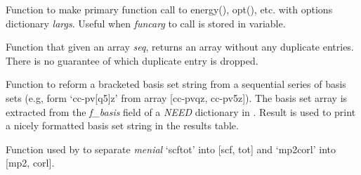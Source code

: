 \documentclass[letterpaper,10pt,english]{sphinxmanual}
\begin{document}
\begin{fulllineitems}
\label{index:wrappers.call_function_in_1st_argument}
Function to make primary function call to energy(), opt(), etc.
with options dictionary \emph{largs}.
Useful when \emph{funcarg} to call is stored in variable.

\end{fulllineitems}


\begin{fulllineitems}
\label{index:wrappers.drop_duplicates}
Function that given an array \emph{seq}, returns an array without any duplicate
entries. There is no guarantee of which duplicate entry is dropped.

\end{fulllineitems}


\begin{fulllineitems}
\label{index:wrappers.n_body}
\end{fulllineitems}


\begin{fulllineitems}
\label{index:wrappers.reconstitute_bracketed_basis}
Function to reform a bracketed basis set string from a sequential series
of basis sets (e.g, form `cc-pv{[}q5{]}z' from array {[}cc-pvqz, cc-pv5z{]}). The
basis set array is extracted from the \emph{f\_basis} field of a \emph{NEED} dictionary in
{\hyperref[index:wrappers.complete_basis_set]{}}. Result is used to print a nicely
formatted basis set string in the results table.

\end{fulllineitems}


\begin{fulllineitems}
\label{index:wrappers.split_menial}
Function used by {\hyperref[index:wrappers.complete_basis_set]{}} to separate
\emph{menial} `scftot' into {[}scf, tot{]} and `mp2corl' into {[}mp2, corl{]}.

\end{fulllineitems}
\end{document}
